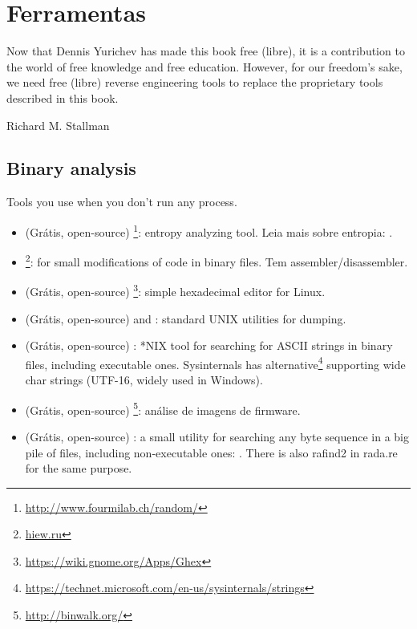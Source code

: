 \chapter{Ferramentas}

\epigraph{Now that Dennis Yurichev has made this book free (libre), it is a
contribution to the world of free knowledge and free education.
However, for our freedom's sake, we need free (libre) reverse
engineering tools to replace the proprietary tools described in this book.}{Richard M. Stallman}

\section{Binary analysis}

Tools you use when you don't run any process.


\begin{itemize}
\item
(Grátis, open-source) \footnote{\url{http://www.fourmilab.ch/random/}}: entropy analyzing tool.
Leia mais sobre entropia: .

\item
\label{Hiew}
\footnote{\href{http://go.yurichev.com/17035}{hiew.ru}}:
for small modifications of code in binary files.
Tem assembler/disassembler.

\item (Grátis, open-source) \footnote{\url{https://wiki.gnome.org/Apps/Ghex}}: simple hexadecimal editor for Linux.

\item (Grátis, open-source)  and : standard UNIX utilities for dumping.

\item (Grátis, open-source) : *NIX tool for searching for ASCII strings in binary files, including executable ones.
Sysinternals has alternative\footnote{\url{https://technet.microsoft.com/en-us/sysinternals/strings}}
supporting wide char strings (UTF-16, widely used in Windows).

\item (Grátis, open-source) \footnote{\url{http://binwalk.org/}}: análise de imagens de firmware.

\item
{}
(Grátis, open-source) :
a small utility for searching any byte sequence in a big pile of files,
including non-executable ones: \BGREPURL.
There is also rafind2 in rada.re for the same purpose.
\end{itemize}

